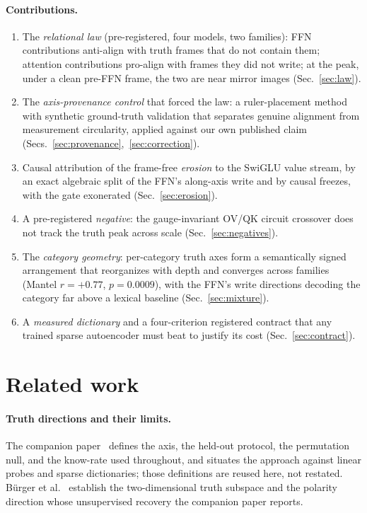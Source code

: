 \documentclass[11pt]{article}
\begin{document}
\paragraph{Contributions.}
\begin{enumerate}
\item The \emph{relational law} (pre-registered, four models, two families):
FFN contributions anti-align with truth frames that do not contain them;
attention contributions pro-align with frames they did not write; at the
peak, under a clean pre-FFN frame, the two are near mirror images
(Sec.~\ref{sec:law}).
\item The \emph{axis-provenance control} that forced the law: a
ruler-placement method with synthetic ground-truth validation that separates
genuine alignment from measurement circularity, applied against our own
published claim (Secs.~\ref{sec:provenance},~\ref{sec:correction}).
\item Causal attribution of the frame-free \emph{erosion} to the SwiGLU
value stream, by an exact algebraic split of the FFN's along-axis write and
by causal freezes, with the gate exonerated (Sec.~\ref{sec:erosion}).
\item A pre-registered \emph{negative}: the gauge-invariant OV/QK circuit
crossover does not track the truth peak across scale
(Sec.~\ref{sec:negatives}).
\item The \emph{category geometry}: per-category truth axes form a
semantically signed arrangement that reorganizes with depth and converges
across families (Mantel $r = +0.77$, $p = 0.0009$), with the FFN's write
directions decoding the category far above a lexical baseline
(Sec.~\ref{sec:mixture}).
\item A \emph{measured dictionary} and a four-criterion registered contract
that any trained sparse autoencoder must beat to justify its cost
(Sec.~\ref{sec:contract}).
\end{enumerate}

\section{Related work}

\paragraph{Truth directions and their limits.} The companion
paper~\cite{companion} defines the axis, the held-out protocol, the
permutation null, and the know-rate used throughout, and situates the
approach against linear probes and sparse dictionaries; those definitions are
reused here, not restated. B\"urger et al.~\cite{burger2024} establish the
two-dimensional truth subspace and the polarity direction whose unsupervised
recovery the companion paper reports.
\end{document}
